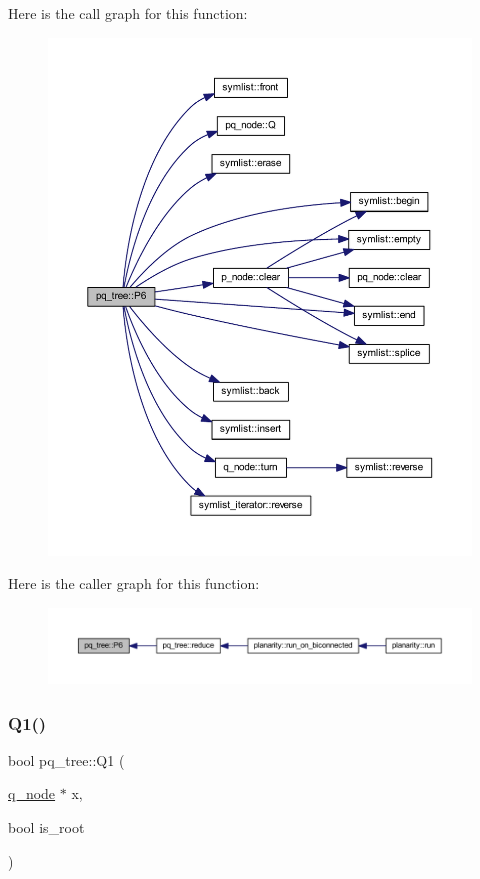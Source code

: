 Here is the call graph for this function\+:\nopagebreak
\begin{figure}[H]
\begin{center}
\leavevmode
\includegraphics[width=350pt]{classpq__tree_afbc208233ab34b2d0ed9e9a7fb5e19a7_cgraph}
\end{center}
\end{figure}
Here is the caller graph for this function\+:\nopagebreak
\begin{figure}[H]
\begin{center}
\leavevmode
\includegraphics[width=350pt]{classpq__tree_afbc208233ab34b2d0ed9e9a7fb5e19a7_icgraph}
\end{center}
\end{figure}
\mbox{\label{classpq__tree_ab1c7266de209f9ac9f3267b4d8cafc48}} 
\subsubsection{\texorpdfstring{Q1()}{Q1()}}
{\footnotesize\ttfamily bool pq\+\_\+tree\+::\+Q1 (\begin{DoxyParamCaption}\item[{\mbox{\hyperlink{classq__node}{q\+\_\+node}} $\ast$}]{x,  }\item[{bool}]{is\+\_\+root }\end{DoxyParamCaption})\hspace{0.3cm}{\ttfamily [private]}}



